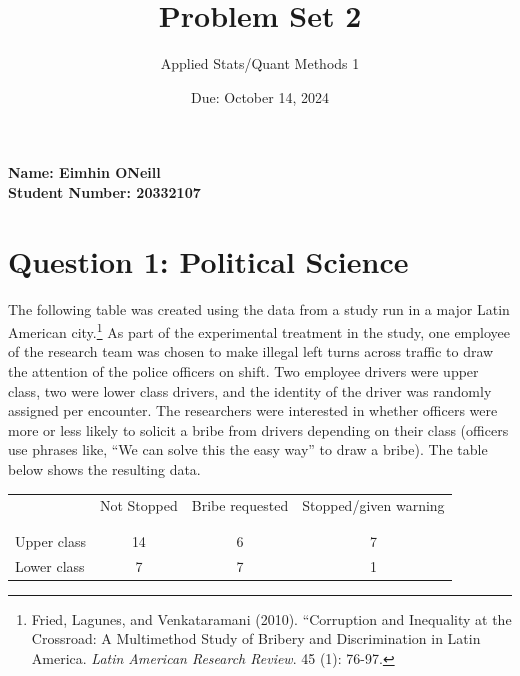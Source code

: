\documentclass[12pt,letterpaper]{article}
\title{Problem Set 2}
\date{Due: October 14, 2024}
\author{Applied Stats/Quant Methods 1}
\begin{document}
		\maketitle
		\vspace{-2em} 
		\noindent \textbf{Name: Eimhin ONeill} \\
		\noindent \textbf{Student Number: 20332107} \\
	
	\vspace{.5cm}
	\section*{Question 1: Political Science}
		\vspace{.25cm}
	The following table was created using the data from a study run in a major Latin American city.\footnote{Fried, Lagunes, and Venkataramani (2010). ``Corruption and Inequality at the Crossroad: A Multimethod Study of Bribery and Discrimination in Latin America. \textit{Latin American Research Review}. 45 (1): 76-97.} As part of the experimental treatment in the study, one employee of the research team was chosen to make illegal left turns across traffic to draw the attention of the police officers on shift. Two employee drivers were upper class, two were lower class drivers, and the identity of the driver was randomly assigned per encounter. The researchers were interested in whether officers were more or less likely to solicit a bribe from drivers depending on their class (officers use phrases like, ``We can solve this the easy way'' to draw a bribe). The table below shows the resulting data.

\newpage
\begin{table}[h!]
	\centering
	\begin{tabular}{l | c c c }
		& Not Stopped & Bribe requested & Stopped/given warning \\
		\\[-1.8ex] 
		\hline \\[-1.8ex]
		Upper class & 14 & 6 & 7 \\
		Lower class & 7 & 7 & 1 \\
		\hline
	\end{tabular}
\end{table}
\end{document}
